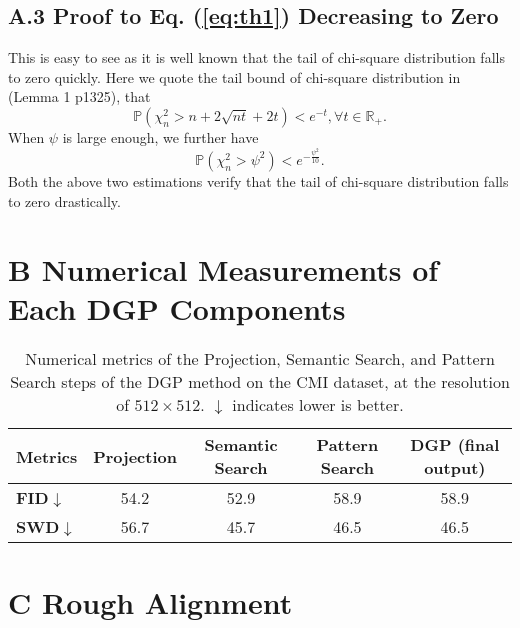 \documentclass[10pt,twocolumn,letterpaper]{article}
\newcommand{\FID}{\textbf{FID$\downarrow$}}  \newcommand{\PPL}{\textbf{PPL$\downarrow$}}  \newcommand{\SSIM}{\textbf{SSIM$\downarrow$}}  \newcommand{\SWD}{\textbf{SWD$\downarrow$}}
\begin{document}
\subsection*{A.3 Proof to Eq. (\ref{eq:th1}) Decreasing to Zero}
This is easy to see as it is well known that the tail of chi-square distribution falls to zero quickly. Here we quote the tail bound of chi-square distribution in \cite{laurent2000adaptive} (Lemma 1 p1325), that 
\begin{equation}
    \mathbb{P}(\chi_n^2>n+2\sqrt{nt}+2t)<e^{-t}, \forall t\in\mathbb{R}_+.
\end{equation}
When $\psi$ is large enough, we further have
\begin{equation}
    \mathbb{P}(\chi_n^2>\psi^2)<e^{-\frac{\psi^2}{10}}.
\end{equation}
Both the above two estimations verify that the tail of chi-square distribution falls to zero drastically.









\section*{B Numerical Measurements of Each DGP Components}
\begin{table}[h]
\caption{
    Numerical metrics of the Projection, Semantic Search, and Pattern Search steps of the DGP method on the CMI dataset, at the resolution of $512\times512$. $\downarrow$ indicates lower is better.
  }
  \label{tab:metrics_s}
  \centering
  \begin{tabular}{lcccc}
		\toprule
		Metrics & Projection & Semantic Search & Pattern Search & DGP (final output) \\
		\midrule
		\FID & 54.2 & 52.9 & 58.9 & 58.9 \\
		\SWD & 56.7 & 45.7 & 46.5 & 46.5 \\
		\bottomrule
	\end{tabular} 
\end{table}


\section*{C Rough Alignment}
\end{document}
